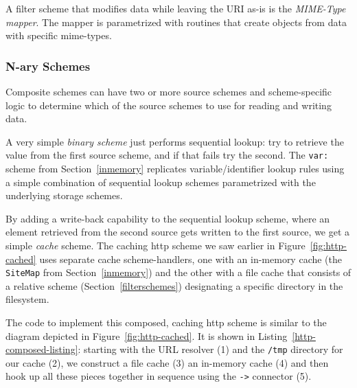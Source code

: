 \documentclass[preprint]{sigplanconf}
\begin{document}


A filter scheme that modifies data while leaving the URI as-is is the \emph{MIME-Type mapper}.
The mapper is parametrized with routines that create objects from data with specific
mime-types.  


\subsubsection{N-ary Schemes}

Composite schemes can have two or more source schemes and scheme-specific logic
to determine which of the source schemes to use for reading and writing data.

A very simple \emph{binary scheme} just performs sequential lookup:  try to
retrieve the value from the first source scheme, and if that fails try the second.
The {\tt var:} scheme from Section~\ref{inmemory}  replicates variable/identifier
lookup rules using a simple combination of sequential lookup schemes parametrized
with the underlying storage schemes.

By adding a write-back capability to the sequential lookup scheme, where an element
retrieved from the second source gets written to the first source, we get a simple \emph{cache} scheme.  
The caching http scheme we saw earlier in Figure~\ref{fig:http-cached} uses
separate cache scheme-handlers, one with an in-memory cache (the {\tt SiteMap} from Section~\ref{inmemory})
and the other with a file cache that consists of a relative scheme (Section~\ref{filterschemes}) 
designating a specific directory in the filesystem.

The code to implement this composed, caching http scheme is similar 
to the diagram depicted in Figure~\ref{fig:http-cached}.  It is shown in Listing~\ref{http-composed-listing}:  
starting with the URL resolver (1) and the {\tt /tmp} directory for our cache (2), we construct
a file cache (3) an in-memory cache (4) and then hook up all these pieces together
in sequence using the {\tt ->} connector (5).
\end{document}
